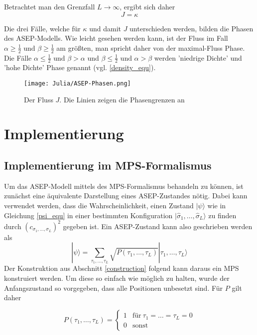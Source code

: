 \documentclass[10pt,a4paper]{report}
\newcommand{\SumIndex}{\sigma_1,\ldots,\sigma_L}
\newcommand{\SumIndexTau}{\tau_1,\ldots,\tau_L}
\begin{document}
Betrachtet man den Grenzfall $L\rightarrow\infty$, ergibt sich daher
\begin{equation}
J=\kappa
\end{equation}

Die drei Fälle, welche für $\kappa$ und damit $J$ unterschieden werden, bilden die Phasen des ASEP-Modells. Wie leicht gesehen werden kann, ist der Fluss im Fall $\alpha\geq\frac{1}{2}\text{ und }\beta\geq\frac{1}{2}$ am größten, man spricht daher von der maximal-Fluss Phase. Die Fälle $\alpha\leq\frac{1}{2}\text{ und }\beta>\alpha$ und $\beta\leq\frac{1}{2}\text{ und }\alpha>\beta$ werden 'niedrige Dichte' und 'hohe Dichte' Phase genannt (vgl. \ref{density_equ}). 


\begin{figure}
\begin{center}
\texttt{[image: Julia/ASEP-Phasen.png]}
\caption{Der Fluss $J$. Die Linien zeigen die Phasengrenzen an}
\end{center}
\end{figure}

 

\chapter{Implementierung}
\section{Implementierung im MPS-Formalismus}

Um das ASEP-Modell mittels des MPS-Formalismus behandeln zu können, ist zunächst eine äquivalente Darstellung eines ASEP-Zustandes nötig. Dabei kann verwendet werden, dass die Wahrscheinlichkeit, einen Zustand $|\psi\rangle$ wie in Gleichung \ref{psi_equ} in einer bestimmten Konfiguration $|\hat{\sigma}_1,\ldots,\hat{\sigma}_L\rangle$ zu finden durch $(c_{\SumIndex})^2$ gegeben ist. Ein ASEP-Zustand kann also geschrieben werden als
\begin{equation}
|\psi\rangle=\sum_{\SumIndexTau} \sqrt{P(\SumIndexTau)}|\SumIndexTau\rangle
\end{equation}
Der Konstruktion aus Abschnitt \ref{construction} folgend kann daraus ein MPS konstruiert werden. Um diese so einfach wie möglich zu halten, wurde der Anfangszustand so vorgegeben, dass alle Positionen unbesetzt sind. Für $P$ gilt daher

\begin{equation}
P(\tau_1,\ldots,\tau_L)=
\begin{cases}
1 & \text{für}\ \tau_1=\ldots=\tau_L=0\\
0 & \text{sonst}
\end{cases}
\end{equation}
\end{document}
